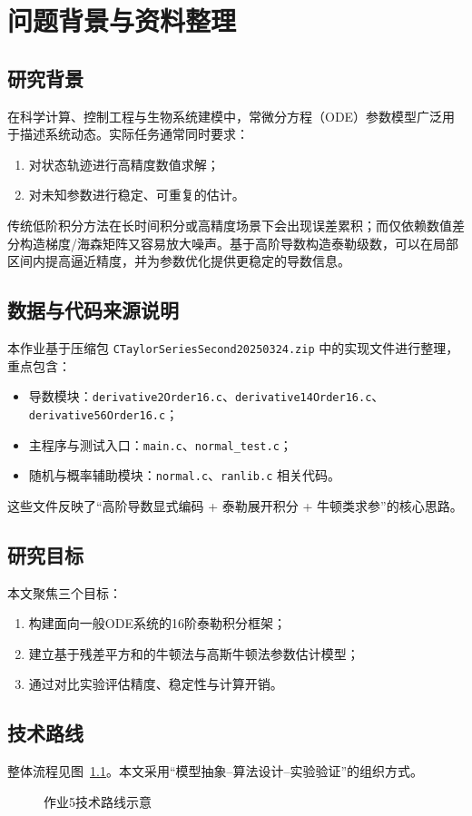 \chapter{问题背景与资料整理}

\section{研究背景}
在科学计算、控制工程与生物系统建模中，常微分方程（ODE）参数模型广泛用于描述系统动态。实际任务通常同时要求：
\begin{enumerate}
  \item 对状态轨迹进行高精度数值求解；
  \item 对未知参数进行稳定、可重复的估计。
\end{enumerate}
传统低阶积分方法在长时间积分或高精度场景下会出现误差累积；而仅依赖数值差分构造梯度/海森矩阵又容易放大噪声。基于高阶导数构造泰勒级数，可以在局部区间内提高逼近精度，并为参数优化提供更稳定的导数信息。

\section{数据与代码来源说明}
本作业基于压缩包 \texttt{CTaylorSeriesSecond20250324.zip} 中的实现文件进行整理，重点包含：
\begin{itemize}
  \item 导数模块：\texttt{derivative2Order16.c}、\texttt{derivative14Order16.c}、\texttt{derivative56Order16.c}；
  \item 主程序与测试入口：\texttt{main.c}、\texttt{normal\_test.c}；
  \item 随机与概率辅助模块：\texttt{normal.c}、\texttt{ranlib.c} 相关代码。
\end{itemize}
这些文件反映了“高阶导数显式编码 + 泰勒展开积分 + 牛顿类求参”的核心思路。

\section{研究目标}
本文聚焦三个目标：
\begin{enumerate}
  \item 构建面向一般ODE系统的16阶泰勒积分框架；
  \item 建立基于残差平方和的牛顿法与高斯牛顿法参数估计模型；
  \item 通过对比实验评估精度、稳定性与计算开销。
\end{enumerate}

\section{技术路线}
整体流程见图~\ref{fig:flow5}。本文采用“模型抽象--算法设计--实验验证”的组织方式。

\begin{figure}[H]
\centering
{}
\caption{作业5技术路线示意}
\label{fig:flow5}
\end{figure}
